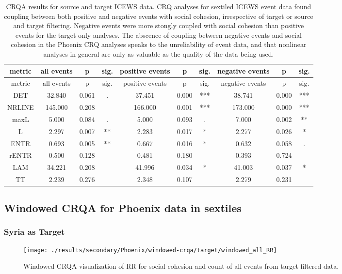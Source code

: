 \documentclass[english,man]{apa6}
\begin{document}
\begin{longtable}[]{@{}cccccccccc@{}}
\caption{CRQA results for source and target ICEWS data.
CRQ analyses for sextiled ICEWS event data found coupling between both positive and negative events with social cohesion, irrespective of target or source and target filtering. Negative events were more stongly coupled with social cohesion than positive events for the target only analyses.
The abscence of coupling between negative events and social cohesion in the Phoenix CRQ analyses speaks to the unreliability of event data, and that nonlinear analyses in general are only as valuable as the quality of the data being used.}\tabularnewline
\toprule
metric & all events & p & sig. & positive events & p & sig. & negative events & p & sig.\tabularnewline
\midrule
\endfirsthead
\toprule
metric & all events & p & sig. & positive events & p & sig. & negative events & p & sig.\tabularnewline
\midrule
\endhead
DET & 32.840 & 0.061 & . & 37.451 & 0.000 & *** & 38.741 & 0.000 & ***\tabularnewline
NRLINE & 145.000 & 0.208 & & 166.000 & 0.001 & *** & 173.000 & 0.000 & ***\tabularnewline
maxL & 5.000 & 0.084 & . & 5.000 & 0.093 & . & 7.000 & 0.002 & **\tabularnewline
L & 2.297 & 0.007 & ** & 2.283 & 0.017 & * & 2.277 & 0.026 & *\tabularnewline
ENTR & 0.693 & 0.005 & ** & 0.667 & 0.016 & * & 0.632 & 0.058 & .\tabularnewline
rENTR & 0.500 & 0.128 & & 0.481 & 0.180 & & 0.393 & 0.724 &\tabularnewline
LAM & 34.221 & 0.208 & & 41.996 & 0.034 & * & 41.003 & 0.037 & *\tabularnewline
TT & 2.239 & 0.276 & & 2.348 & 0.107 & & 2.279 & 0.231 &\tabularnewline
\bottomrule
\end{longtable}

\hypertarget{windowed-crqa-for-phoenix-data-in-sextiles}{%
\subsection{Windowed CRQA for Phoenix data in sextiles}\label{windowed-crqa-for-phoenix-data-in-sextiles}}

\hypertarget{syria-as-target-4}{%
\subsubsection{Syria as Target}\label{syria-as-target-4}}

\begin{figure}
\texttt{[image: ./results/secondary/Phoenix/windowed-crqa/target/windowed\_all\_RR]} \caption{Windowed CRQA visualization of RR for social cohesion and count of all events from target filtered data.}\label{fig:plot-RR-targ-all-secondary-Phoenix}
\end{figure}
\end{document}
